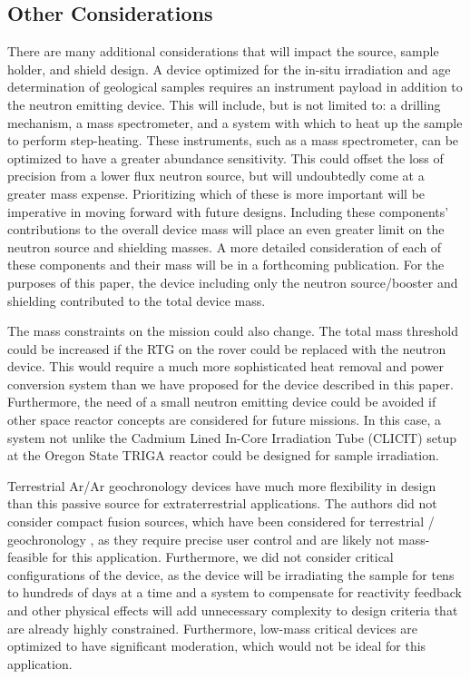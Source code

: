\documentclass{mc2015}
\begin{document}
\subsection{Other Considerations}
\label{sec:others}

There are many additional considerations that will impact the source, sample holder, and shield design. A device optimized for the in-situ irradiation and age determination of geological samples requires an instrument payload in addition to the neutron emitting device. This will include, but is not limited to: a drilling mechanism, a mass spectrometer, and a system with which to heat up the sample to perform step-heating. These instruments, such as a mass spectrometer, can be optimized to have a greater abundance sensitivity. This could offset the loss of precision from a lower flux neutron source, but will undoubtedly come at a greater mass expense. Prioritizing which of these is more important will be imperative in moving forward with future designs. Including these components' contributions to the overall device mass will place an even greater limit on the neutron source and shielding masses. A more detailed consideration of each of these components and their mass will be in a forthcoming publication. For the purposes of this paper, the device including only the neutron source/booster and shielding contributed to the total device mass. 

The mass constraints on the mission could also change. The total mass threshold could be increased if the RTG on the rover could be replaced with the neutron device. This would require a much more sophisticated heat removal and power conversion system than we have proposed for the device described in this paper. Furthermore, the need of a small neutron emitting device could be avoided if other space reactor concepts are considered for future missions. In this case, a system not unlike the Cadmium Lined In-Core Irradiation Tube (CLICIT) setup at the Oregon State TRIGA reactor \cite{OSTRCLICIT} could be designed for sample irradiation.

Terrestrial Ar/Ar geochronology devices have much more flexibility in design than this passive source for extraterrestrial applications. The authors did not consider compact fusion sources, which have been considered for terrestrial / geochronology \cite{renne_application_2005}, as they require precise user control and are likely not mass-feasible for this application. Furthermore, we did not consider critical configurations of the device, as the device will be irradiating the sample for tens to hundreds of days at a time and a system to compensate for reactivity feedback and other physical effects will add unnecessary complexity to  design criteria that are already highly constrained. Furthermore, low-mass critical devices are optimized to have significant moderation, which would not be ideal for this application. 
\end{document}
